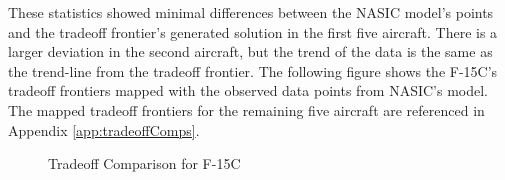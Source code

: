 These statistics showed minimal differences between the NASIC model's points and the tradeoff frontier's generated solution in the first five aircraft. There is a larger deviation in the second aircraft, but the trend of the data is the same as the trend-line from the tradeoff frontier. The following figure shows the F-15C's tradeoff frontiers mapped with the observed data points from NASIC's model. The mapped tradeoff frontiers for the remaining five aircraft are referenced in Appendix \ref{app:tradeoffComps}.
\begin{figure}[H]
    \centering
    \qquad
    \qquad
    \caption{Tradeoff Comparison for F-15C}%
    \label{fig:tradef15}
\end{figure}


